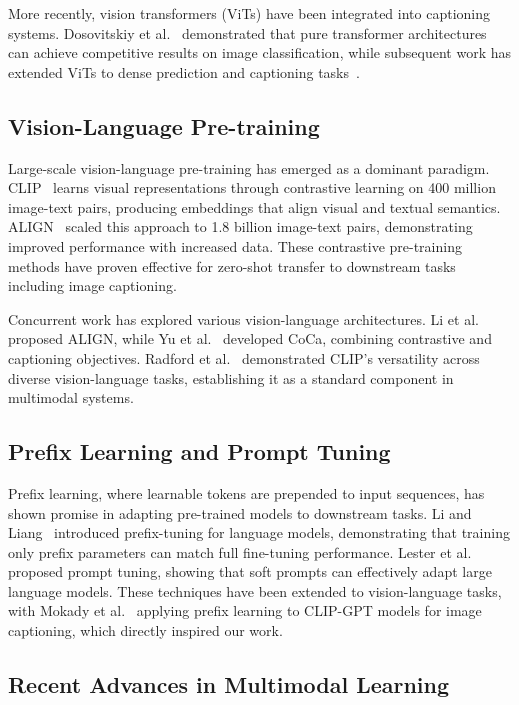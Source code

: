 \documentclass[runningheads]{llncs}
\begin{document}
More recently, vision transformers (ViTs) have been integrated into captioning systems. Dosovitskiy et al.~\cite{dosovitskiy2020image} demonstrated that pure transformer architectures can achieve competitive results on image classification, while subsequent work has extended ViTs to dense prediction and captioning tasks~\cite{strudel2021self}.

\subsection{Vision-Language Pre-training}

Large-scale vision-language pre-training has emerged as a dominant paradigm. CLIP~\cite{radford2021learning} learns visual representations through contrastive learning on 400 million image-text pairs, producing embeddings that align visual and textual semantics. ALIGN~\cite{jia2021scaling} scaled this approach to 1.8 billion image-text pairs, demonstrating improved performance with increased data. These contrastive pre-training methods have proven effective for zero-shot transfer to downstream tasks including image captioning.

Concurrent work has explored various vision-language architectures. Li et al.~\cite{li2021aligning} proposed ALIGN, while Yu et al.~\cite{yu2022scaling} developed CoCa, combining contrastive and captioning objectives. Radford et al.~\cite{radford2021learning} demonstrated CLIP's versatility across diverse vision-language tasks, establishing it as a standard component in multimodal systems.

\subsection{Prefix Learning and Prompt Tuning}

Prefix learning, where learnable tokens are prepended to input sequences, has shown promise in adapting pre-trained models to downstream tasks. Li and Liang~\cite{li2021prefix} introduced prefix-tuning for language models, demonstrating that training only prefix parameters can match full fine-tuning performance. Lester et al.~\cite{lester2021power} proposed prompt tuning, showing that soft prompts can effectively adapt large language models. These techniques have been extended to vision-language tasks, with Mokady et al.~\cite{mokady2021clipcap} applying prefix learning to CLIP-GPT models for image captioning, which directly inspired our work.

\subsection{Recent Advances in Multimodal Learning}
\end{document}
